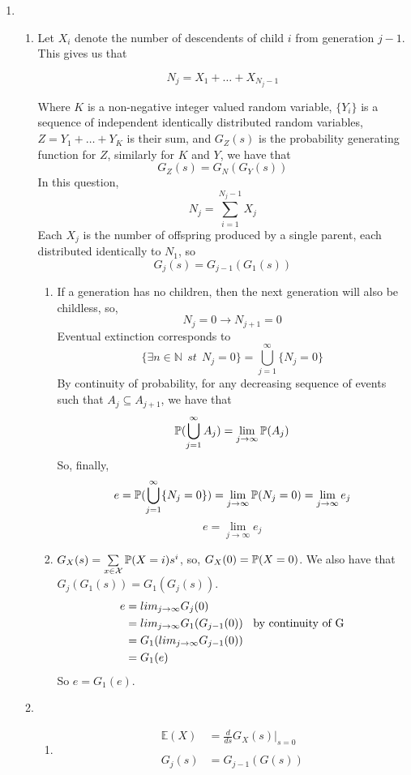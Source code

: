 \documentclass{article}
\begin{document}
\begin{enumerate}
\item
\begin{enumerate}
\item
Let $X_i$ denote the number of descendents of child $i$ from generation $j-1$. This gives us that

$$
N_j = X_1 + \dots + X_{N_j-1}
$$

Where $K$ is a non-negative integer valued random variable, $\{Y_i\}$ is a sequence of independent identically distributed random variables, $Z=Y_1+\dots+Y_K$ is their sum, and $G_Z(s)$ is the probability generating function for $Z$, similarly for $K$ and $Y$, we have that
$$
G_Z(s) = G_N(G_Y(s))
$$
In this question, 
$$
N_j=\sum^{N_j-1}_{i=1}X_j
$$
Each $X_j$ is the number of offspring produced by a single parent, each distributed identically to $N_1$, so
$$
G_j(s) = G_{j-1}(G_1(s))
$$
\begin{enumerate}
\item 
If a generation has no children, then the next generation will also be childless, so,
$$
N_j=0 \rightarrow N_{j+1}=0
$$
Eventual extinction corresponds to 
$$
\{\exists n \in \mathbb{N} \;\, st \;\, N_j=0\} = \bigcup^\infty_{j=1}\{N_j=0\}
$$
By continuity of probability, for any decreasing sequence of events such that $A_j \subseteq A_{j+1}$, we have that
$$
\mathbb{P}(\bigcup^\infty_{j=1}A_j) = \lim_{j\rightarrow\infty} \mathbb{P}(A_j)
$$
So, finally,
$$
e=\mathbb{P}(\bigcup^\infty_{j=1}\{N_j=0\}) = \lim_{j\rightarrow\infty} \mathbb{P}(N_j=0) = \lim_{j\rightarrow\infty}e_j
$$
$$
e=\lim_{j\rightarrow\infty}e_j
$$
\item
$G_X(s) = \sum\limits_{x \in \mathcal{X}}\mathbb{P}(X=i)s^i$, so, $G_X(0) = \mathbb{P}(X=0)$. We also have that $G_j(G_1(s)) = G_1(G_j(s))$.
\begin{align*}
e &= lim_{j\rightarrow\infty}G_j(0)\\
&= lim_{j\rightarrow\infty}G_1(G_{j-1}(0))\mbox{\;\; by continuity of G}\\
&= G_1(lim_{j\rightarrow\infty}G_{j-1}(0))\\
&= G_1(e)
\end{align*}
So $e = G_1(e)$.
\end{enumerate}
\item
\begin{enumerate}
\item
\begin{align*}
\mathbb{E}(X) &= \frac{d}{ds}G_X(s)|_{s=0}\\
\\
G_j(s) &= G_{j-1}(G(s))\\

\end{align*}
\end{enumerate}
\end{enumerate}
\end{enumerate}
\end{document}
